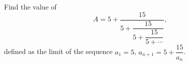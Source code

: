 Find the value of
\[A=5+\dfrac{15}{5+\dfrac{15}{5+\dfrac{15}{5+\cdots}}},\]
defined as the limit of the sequence $a_1=5$, $a_{n+1}=5+\dfrac{15}{a_n}$.
